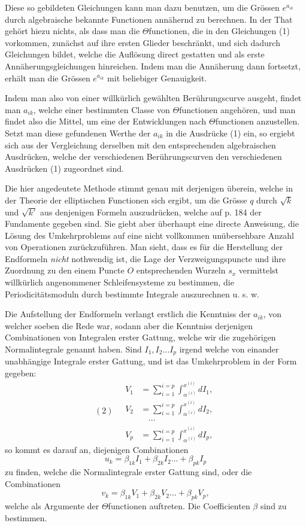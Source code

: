 \documentclass[10pt]{article}
\begin{document}
Diese so gebildeten Gleichungen kann man dazu benutzen, um die Grössen \(e^{a_{ik}}\) durch algebraische bekannte Functionen annähernd zu berechnen. In der That gehört hiezu nichts, als dass man die \(\Theta\)functionen, die in den Gleichungen (1) vorkommen, zunächst auf ihre ersten Glieder beschränkt, und sich dadurch Gleichungen bildet, welche die Auflösung direct gestatten und als erste Annäherungsgleichungen hinreichen. Indem man die Annäherung dann fortsetzt, erhält man die Grössen \(e^{a_{ik}}\) mit beliebiger Genauigkeit.

Indem man also von einer willkürlich gewählten Berührungscurve ausgeht, findet man \(a_{ik}\), welche einer bestimmten Classe von \(\Theta\)functionen angehören, und man findet also die Mittel, um eine der Entwicklungen nach \(\Theta\)functionen anzustellen. Setzt man diese gefundenen Werthe der \(a_{ik}\) in die Ausdrücke (1) ein, so ergiebt sich aus der Vergleichung derselben mit den entsprechenden algebraischen Ausdrücken, welche der verschiedenen Berührungscurven den verschiedenen Ausdrücken (1) zugeordnet sind.

Die hier angedeutete Methode stimmt genau mit derjenigen überein, welche in der Theorie der elliptischen Functionen sich ergibt, um die Grösse \(q\) durch \(\sqrt{k}\) und \(\sqrt{k'}\) aus denjenigen Formeln auszudrücken, welche auf p. 184 der Fundamente gegeben sind. Sie giebt aber überhaupt eine directe Anweisung, die Lösung des Umkehrproblems auf eine nicht vollkommen unübersehbare Anzahl von Operationen zurückzuführen. Man sieht, dass es für die Herstellung der Endformeln \emph{nicht} nothwendig ist, die Lage der Verzweigungspuncte und ihre Zuordnung zu den einem Puncte \(O\) entsprechenden Wurzeln \(s_x\) vermittelst willkürlich angenommener Schleifensysteme zu bestimmen, die Periodicitätsmoduln durch bestimmte Integrale auszurechnen u. s. w.

Die Aufstellung der Endformeln verlangt erstlich die Kenntniss der \(a_{ik}\), von welcher soeben die Rede war, sodann aber die Kenntniss derjenigen Combinationen von Integralen erster Gattung, welche wir die zugehörigen Normalintegrale genannt haben. Sind \(I_1,I_2\ldots I_p\) irgend welche von einander unabhängige Integrale erster Gattung, und ist das Umkehrproblem in der Form gegeben:
\[
(2)\quad
\begin{aligned}
V_1&=\sum_{i=1}^{i=p}\int_{\alpha^{(i)}}^{x^{(i)}}dI_1,\\
V_2&=\sum_{i=1}^{i=p}\int_{\alpha^{(i)}}^{x^{(i)}}dI_2,\\[-0.25em]
&\quad\cdots\\[-0.25em]
V_p&=\sum_{i=1}^{i=p}\int_{\alpha^{(i)}}^{x^{(i)}}dI_p,
\end{aligned}
\]
so kommt es darauf an, diejenigen Combinationen
\[
u_k=\beta_{1k}I_1+\beta_{2k}I_2\ldots+\beta_{pk}I_p
\]
zu finden, welche die Normalintegrale erster Gattung sind, oder die Combinationen
\[
v_k=\beta_{1k}V_1+\beta_{2k}V_2\ldots+\beta_{pk}V_p,
\]
welche als Argumente der \(\Theta\)functionen auftreten. Die Coefficienten \(\beta\) sind zu bestimmen.
\end{document}

